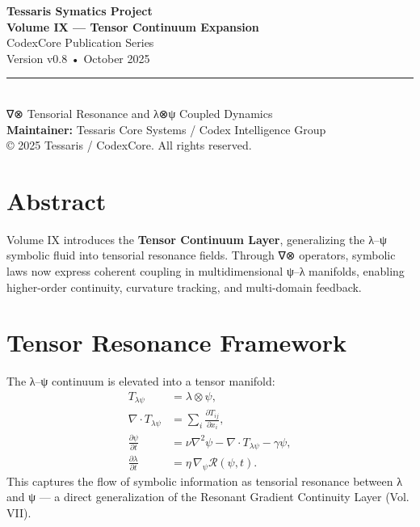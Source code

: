 \documentclass[11pt]{article}
\begin{document}
\begin{titlepage}
\centering
\vspace*{1.5cm}
{\Huge \textbf{Tessaris Symatics Project}}\\[1.2cm]
{\LARGE \textbf{Volume IX — Tensor Continuum Expansion}}\\[6pt]
{\large CodexCore Publication Series}\\[0.4cm]
{\small Version v0.8 • October 2025}\\[0.4cm]
\rule{0.65\textwidth}{0.5pt}\\[0.5cm]
{\large ∇⊗ Tensorial Resonance and λ⊗ψ Coupled Dynamics}\\[1.2cm]
\textbf{Maintainer:} Tessaris Core Systems / Codex Intelligence Group\\[4pt]
\vfill
{\small © 2025 Tessaris / CodexCore. All rights reserved.}
\end{titlepage}

\section*{Abstract}
Volume IX introduces the \textbf{Tensor Continuum Layer}, generalizing the λ–ψ symbolic fluid into tensorial resonance fields.  
Through ∇⊗ operators, symbolic laws now express coherent coupling in multidimensional ψ–λ manifolds, enabling higher-order continuity, curvature tracking, and multi-domain feedback.

\section{Tensor Resonance Framework}
The λ–ψ continuum is elevated into a tensor manifold:
\[
\begin{aligned}
T_{\lambda\psi} &= \lambda \otimes \psi,\\[4pt]
\nabla \cdot T_{\lambda\psi} &= \sum_i \frac{\partial T_{ij}}{\partial x_i},\\[4pt]
\frac{\partial\psi}{\partial t} &= \nu\nabla^2\psi - \nabla\cdot T_{\lambda\psi} - \gamma\psi,\\[4pt]
\frac{\partial\lambda}{\partial t} &= \eta\,\nabla_\psi\mathcal{R}(\psi,t).
\end{aligned}
\]
This captures the flow of symbolic information as tensorial resonance between λ and ψ — a direct generalization of the Resonant Gradient Continuity Layer (Vol. VII).
\end{document}
